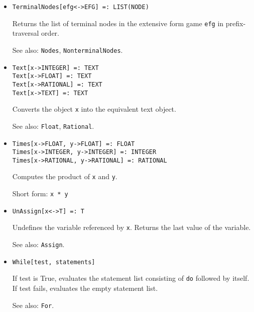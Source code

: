 \begin{itemize}

\item
\protect \large \begin{verbatim} 
TerminalNodes[efg<->EFG] =: LIST(NODE)
\end{verbatim}\normalsize

\bd
Returns the list of terminal nodes in the extensive form
game \verb+efg+ in prefix-traversal order.
\item
[See also:] {\tt Nodes}, {\tt NonterminalNodes}.
\ed

\item
\protect \large \begin{verbatim}
Text[x->INTEGER] =: TEXT
Text[x->FLOAT] =: TEXT
Text[x->RATIONAL] =: TEXT
Text[x->TEXT] =: TEXT
\end{verbatim} \normalsize

\bd
Converts the object \verb+x+ into the equivalent text object.
\item
[See also:] {\tt Float}, {\tt Rational}.
\ed

\item 
\protect \large \begin{verbatim}
Times[x->FLOAT, y->FLOAT] =: FLOAT
Times[x->INTEGER, y->INTEGER] =: INTEGER
Times[x->RATIONAL, y->RATIONAL] =: RATIONAL
\end{verbatim} \normalsize
  
\bd
Computes the product of \verb+x+ and \verb+y+.
\item
[Short form:] \verb+x * y+
\ed


\item
\protect \large \begin{verbatim}
UnAssign[x<->T] =: T
\end{verbatim}\normalsize

\bd
Undefines the variable referenced by \verb+x+.  Returns the
last value of the variable.
\item
[See also:] {\tt Assign}.
\ed



\item 
\protect \large \begin{verbatim}
While[test, statements]
\end{verbatim} \normalsize
  
\bd
If test is True, evaluates the statement list consisting of
\verb+do+ followed by itself.  If test fails, evaluates the empty
statement list.
\item
[See also:] \verb+For+.
\ed


\end{itemize}
